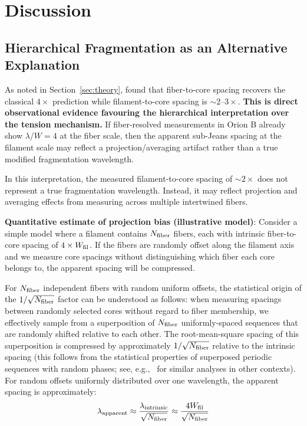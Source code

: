 \documentclass[11pt,a4paper]{article}
\begin{document}
\section{Discussion}
\label{sec:discussion}

\subsection{Hierarchical Fragmentation as an Alternative Explanation}
\label{sec:hierarchical}

As noted in Section~\ref{sec:theory}, \citet{Yang2024} found that fiber-to-core spacing recovers the classical $4\times$ prediction while filament-to-core spacing is $\sim2$--$3\times$. \textbf{This is direct observational evidence favouring the hierarchical interpretation over the tension mechanism.} If fiber-resolved measurements in Orion B already show $\lambda/W = 4$ at the fiber scale, then the apparent sub-Jeans spacing at the filament scale may reflect a projection/averaging artifact rather than a true modified fragmentation wavelength.

In this interpretation, the measured filament-to-core spacing of $\sim2\times$ does not represent a true fragmentation wavelength. Instead, it may reflect projection and averaging effects from measuring across multiple intertwined fibers.

\textbf{Quantitative estimate of projection bias (illustrative model)}: Consider a simple model where a filament contains $N_{\rm fiber}$ fibers, each with intrinsic fiber-to-core spacing of $4\times W_{\rm fil}$. If the fibers are randomly offset along the filament axis and we measure core spacings without distinguishing which fiber each core belongs to, the apparent spacing will be compressed.

For $N_{\rm fiber}$ independent fibers with random uniform offsets, the statistical origin of the $1/\sqrt{N_{\rm fiber}}$ factor can be understood as follows: when measuring spacings between randomly selected cores without regard to fiber membership, we effectively sample from a superposition of $N_{\rm fiber}$ uniformly-spaced sequences that are randomly shifted relative to each other. The root-mean-square spacing of this superposition is compressed by approximately $1/\sqrt{N_{\rm fiber}}$ relative to the intrinsic spacing (this follows from the statistical properties of superposed periodic sequences with random phases; see, e.g.,~\citet{Cheng2014} for similar analyses in other contexts). For random offsets uniformly distributed over one wavelength, the apparent spacing is approximately:
\begin{equation}
\lambda_{\rm apparent} \approx \frac{\lambda_{\rm intrinsic}}{\sqrt{N_{\rm fiber}}} \approx \frac{4 W_{\rm fil}}{\sqrt{N_{\rm fiber}}}
\label{eq:projection_bias}
\end{equation}
\end{document}
